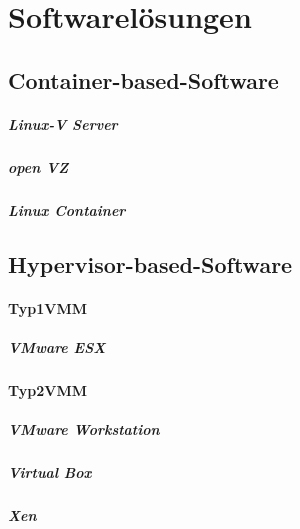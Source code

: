 \thispagestyle{empty}

\section{Softwarelösungen}

\subsection{Container-based-Software}

\subparagraph{Linux-V Server}

\subparagraph{open VZ}

\subparagraph{Linux Container}



\subsection{Hypervisor-based-Software}

\paragraph{Typ1VMM}
\subparagraph {VMware ESX}


\paragraph{Typ2VMM}
\subparagraph {VMware Workstation}
\subparagraph{Virtual Box}

\subparagraph {Xen}
